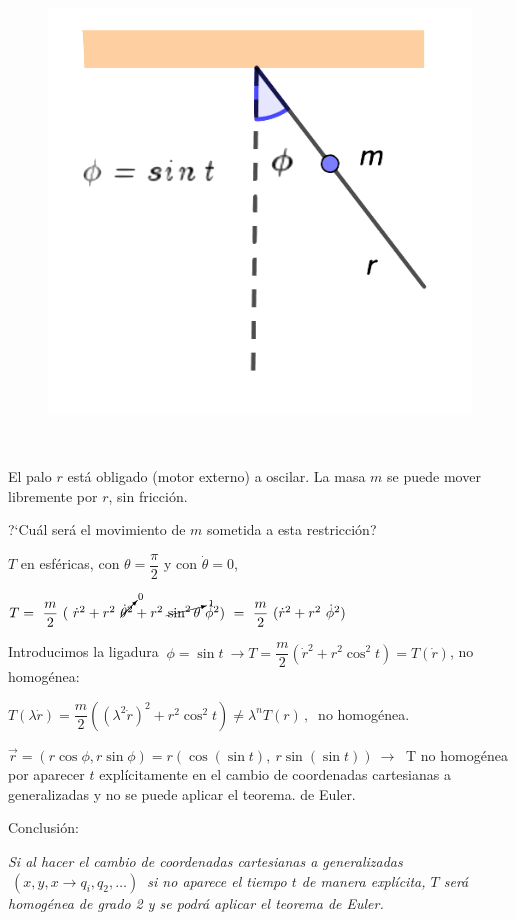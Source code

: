\begin{multicols}{2}
	\begin{figure}[H]
	\centering
	\includegraphics[width=.3\textwidth]{imagenes/img12-02.png}
\end{figure}
$\quad$

El palo $r$ está obligado (motor externo) a oscilar. La masa $m$ se puede mover libremente por $r$, sin fricción. 

?`Cuál será el movimiento de $m$ sometida a esta restricción?

\end{multicols}

$T$ en esféricas, con $\theta=\dfrac {\pi}{2}$ y con $\dot \theta = 0$,

$T=\ \dfrac m 2 \ (\ \dot r^2  +  r^2 \ \cancelto{0}{\dot \theta^2}  +  r^2 \ \cancelto{1}{\sin^2 \theta }\ \dot \phi^2  ) \ = \ \dfrac m2 \ (\dot r^2 + r^2\ \dot \phi^2)$

Introducimos la ligadura $\ \phi=\sin t \ \to T=\dfrac m 2 (\dot r^2 + r^2 \cos^2 t)=T(\dot r)$, no homogénea:

$T(\lambda \dot r)=\dfrac m 2 \left( (\lambda^2 \dot  r)^2 + r^2 \cos^2 t \right) \neq \lambda^n T(r) \, , \ $ no homogénea.

$\vec r=(r\cos \phi, r \sin \phi)=r\left( \cos(\sin t),\ r\sin(\sin t) \right) \ \to \ $ T no homogénea por aparecer $t$ explícitamente en el cambio de coordenadas cartesianas a generalizadas y no se puede aplicar el teorema. de Euler.


\vspace{5mm}
Conclusión:
\vspace{3mm}
\begin{adjustwidth}{20pt}{0pt}
\begin{destacado}
\emph{Si al hacer el cambio de coordenadas cartesianas a generalizadas $\ (x,y,x \to q_i, q_2, \dots)\ $ si no aparece el tiempo $t$ de manera explícita, $T$ será homogénea de grado 2 y se podrá aplicar el teorema de Euler.}	
\end{destacado}
\end{adjustwidth}





